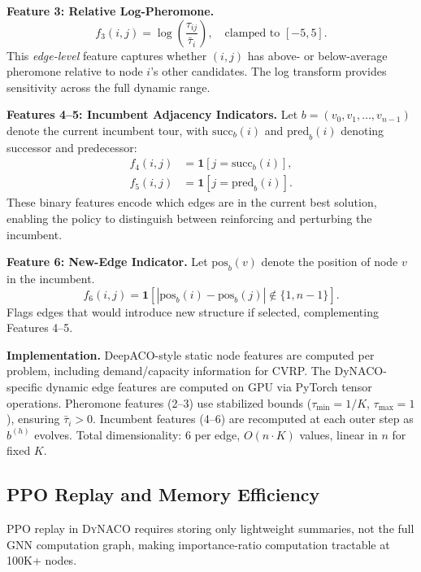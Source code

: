 \documentclass[sigconf]{acmart}
\newcommand{\DyNACO}{\textsc{DyNACO}}
\begin{document}
\textbf{Feature 3: Relative Log-Pheromone.}
\begin{equation}
f_3(i,j) = \log\!\left(\frac{\tau_{ij}}{\bar{\tau}_i}\right), \quad \text{clamped to } [-5, 5].
\end{equation}
This \emph{edge-level} feature captures whether $(i,j)$ has above- or below-average pheromone relative to node $i$'s other candidates.
The log transform provides sensitivity across the full dynamic range.

\textbf{Features 4--5: Incumbent Adjacency Indicators.}
Let $b = (v_0, v_1, \ldots, v_{n-1})$ denote the current incumbent tour, with $\mathrm{succ}_b(i)$ and $\mathrm{pred}_b(i)$ denoting successor and predecessor:
\begin{align}
f_4(i,j) &= \mathbf{1}[j = \mathrm{succ}_b(i)], \\
f_5(i,j) &= \mathbf{1}[j = \mathrm{pred}_b(i)].
\end{align}
These binary features encode which edges are in the current best solution, enabling the policy to distinguish between reinforcing and perturbing the incumbent.

\textbf{Feature 6: New-Edge Indicator.}
Let $\mathrm{pos}_b(v)$ denote the position of node $v$ in the incumbent.
\begin{equation}
f_6(i,j) = \mathbf{1}\!\left[|\mathrm{pos}_b(i) - \mathrm{pos}_b(j)| \notin \{1, n{-}1\}\right].
\end{equation}
Flags edges that would introduce new structure if selected, complementing Features 4--5.

\textbf{Implementation.}
DeepACO-style static node features are computed per problem, including demand/capacity information for CVRP. The DyNACO-specific dynamic edge features are computed on GPU via PyTorch tensor operations.
Pheromone features (2--3) use stabilized bounds ($\tau_{\min}=1/K$, $\tau_{\max}=1$), ensuring $\bar{\tau}_i > 0$.
Incumbent features (4--6) are recomputed at each outer step as $b^{(h)}$ evolves.
Total dimensionality: 6 per edge, $O(n \cdot K)$ values, linear in $n$ for fixed $K$.



\subsection{PPO Replay and Memory Efficiency}
\label{app:ppo-replay}

PPO replay in \DyNACO{} requires storing only lightweight summaries, not the full GNN computation graph, making importance-ratio computation tractable at 100K+ nodes.
\end{document}
